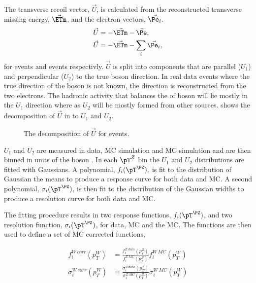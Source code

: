 The transverse recoil vector, $\vec{U}$, is calculated from the reconstructed
transverse missing energy, $\vec{\ETm}$, and the electron \ET vectors,
$\vec{\Pe_{i}}$.
\begin{align}
\vec{U} &= - \vec{\ETm} - \vec{\Pe},\\
\vec{U} &= - \vec{\ETm} - \sum_i \vec{\Pe_{i}},
\end{align}
for \PW events and \PZ events respectivly. $\vec{U}$ is split into components
that are parallel ($U_1$) and perpendicular ($U_2$) to the true boson \pT
direction. 
In real \PZ data events where the true direction of the boson \pT is not known,
the \pT direction is reconstructed from the two electrons.
The hadronic activity that balances the \pT of boson will lie mostly in the
$U_1$ direction where as $U_2$ will be mostly formed from other sources.
 shows the decomposition of $\vec{U}$ in to $U_1$ and
$U_2$.
\begin{figure}
  \begin{center}
    \caption{The decomposition of $\vec{U}$ for \PW events.}
    \label{fig:recoil}
  \end{center}
\end{figure}

$U_1$ and $U_2$ are measured in \PZ data, \PZ \ac{MC} simulation and \PW \ac{MC}
simulation and are then binned in units of the boson \pT.  In each $\pT^{Z}$ bin
the $U_1$ and $U_2$ distributions are fitted with Gaussians.  A polynomial,
$f_i(\pT^\PZ)$, is fit to the distribution of Gaussian the means to produce a
response curve for both data and \ac{MC}.  A second polynomial,
$\sigma_i(\pT^\PZ)$, is then fit to the distribution of the Gaussian widths to
produce a resolution curve for both data and \ac{MC}.

The fitting procedure results in two response functions, $f_i(\pT^\PZ)$, and two
resolution function, $\sigma_i(\pT^\PZ)$, for \PZ data, \PZ \ac{MC} and the \PW
\ac{MC}. The functions are then used to define a set of \PW \ac{MC} corrected
functions, 

\begin{align}
f^{W\ corr}_i (p^{W}_T)      
  &= \frac{ f^{Z\ data}_i (p^{Z}_T) }
          { f^{Z\ MC}_i (p^{Z}_T) }
          f^{W\ MC}_i (p^{W}_T) \\
\sigma^{W\ corr}_i (p^{W}_T) 
  &= \frac{ \sigma^{Z\ data}_i (p^{Z}_T) }
          { \sigma^{Z\ MC}_i (p^{Z}_T) }
          \sigma^{W\ MC}_i (p^{W}_T) 
\end{align}


